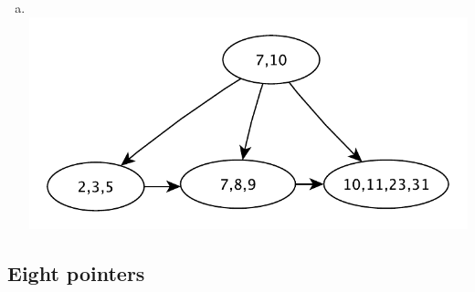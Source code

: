 \documentclass[a4paper,11pt]{article}
\begin{document}
\begin{enumerate}[a.]
    \item ~\\
        \includegraphics[scale=0.7]{2-2-5}
\end{enumerate}

\subsection*{Eight pointers}
\end{document}
